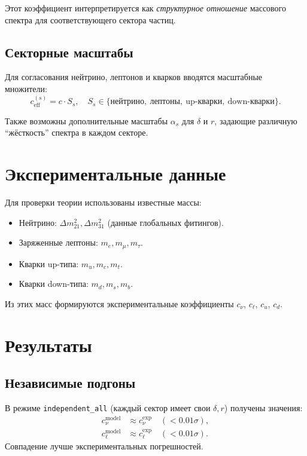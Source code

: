 \documentclass[12pt,a4paper]{article}
\begin{document}
Этот коэффициент интерпретируется как \emph{структурное отношение} 
массового спектра для соответствующего сектора частиц.

\subsection{Секторные масштабы}
Для согласования нейтрино, лептонов и кварков вводятся масштабные множители:
\begin{equation}
c_{\text{eff}}^{(s)} = c \cdot S_s, \quad 
S_s \in \{\text{нейтрино}, \ \text{лептоны}, \ \text{up-кварки}, \ \text{down-кварки}\}.
\end{equation}

Также возможны дополнительные масштабы $\alpha_s$ для $\delta$ и $r$, 
задающие различную ``жёсткость'' спектра в каждом секторе.

\section{Экспериментальные данные}
Для проверки теории использованы известные массы:
\begin{itemize}
  \item Нейтрино: $\Delta m^2_{21}, \Delta m^2_{31}$ (данные глобальных фитингов).
  \item Заряженные лептоны: $m_e, m_\mu, m_\tau$.
  \item Кварки up-типа: $m_u, m_c, m_t$.
  \item Кварки down-типа: $m_d, m_s, m_b$.
\end{itemize}

Из этих масс формируются экспериментальные коэффициенты $c_\nu$, $c_\ell$, $c_u$, $c_d$.

\section{Результаты}
\subsection{Независимые подгоны}
В режиме \texttt{independent\_all} (каждый сектор имеет свои $\delta,r$) получены значения:
\begin{align*}
c_\nu^{\text{model}} &\approx c_\nu^{\text{exp}} \quad (<0.01\sigma), \\
c_\ell^{\text{model}} &\approx c_\ell^{\text{exp}} \quad (<0.01\sigma).
\end{align*}
Совпадение лучше экспериментальных погрешностей.
\end{document}
